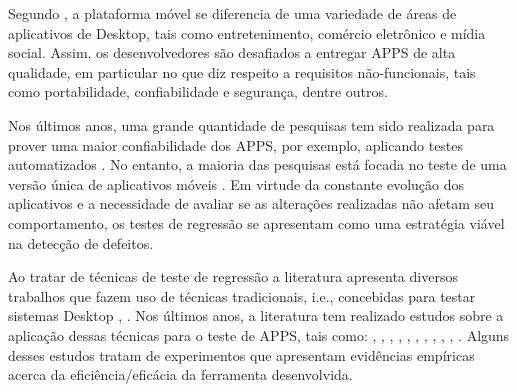 Segundo , a plataforma móvel se diferencia de uma variedade de áreas de aplicativos de Desktop, tais como entretenimento, comércio eletrônico e mídia social. Assim, os desenvolvedores são desafiados a entregar \ac{APPS} de alta qualidade, em particular no que diz respeito a requisitos não-funcionais, tais como portabilidade, confiabilidade e segurança, dentre outros.

Nos últimos anos, uma grande quantidade de pesquisas tem sido realizada para prover uma maior confiabilidade dos \ac{APPS}, por exemplo, aplicando testes automatizados \cite{7927972, 8424973, 8453877}. No entanto, a maioria das pesquisas está focada no teste de uma versão única de aplicativos móveis \cite{Do2016RedroidAR}. Em virtude da constante evolução dos aplicativos e a necessidade de avaliar se as alterações realizadas não afetam seu comportamento, os testes de regressão se apresentam como uma estratégia viável \cite{8377661} na detecção de defeitos.   


Ao tratar de técnicas de teste de regressão a literatura apresenta diversos trabalhos que fazem uso de técnicas tradicionais, i.e., concebidas para testar sistemas Desktop \cite{536955}, \cite{ENGSTROM201014}. Nos últimos anos, a literatura tem realizado estudos sobre a aplicação dessas técnicas para o teste de \ac{APPS}, tais como: \cite{5954416}, \cite{6339502}, \cite{6569773}, \cite{Do2016RedroidAR},  \cite{7427895}, \cite{7832883}, \cite{7833000},  \cite{7927972}, \cite{Choi:2018:DMA:3180155.3180173}, \cite{8377661}, \cite{8424973}. Alguns desses estudos tratam de experimentos que apresentam evidências empíricas acerca da eficiência/eficácia da ferramenta desenvolvida.



